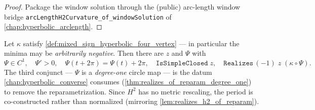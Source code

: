 \begin{proof}
  \leanok
  Package the window solution through the (public) arc-length window bridge
  \texttt{arcLengthH2Curvature\_of\_windowSolution} of
  \cref{chap:hyperbolic_arclength}.
\end{proof}

\begin{theorem}
  \label{thm:hyperbolic_mixed_converse_reparam_deg1}
  Let $\kappa$ satisfy \cref{def:mixed_sign_hyperbolic_four_vertex} — in
  particular the minima may be \emph{arbitrarily negative}.  Then there are
  $z$ and $\Psi$ with
  \[
    \Psi\in C^1,\quad \Psi'>0,\quad
    \Psi(t+2\pi)=\Psi(t)+2\pi,\quad
    \texttt{IsSimpleClosed}\;z,\quad
    \texttt{Realizes}\,(-1)\;z\;(\kappa\circ\Psi).
  \]
  The third conjunct — $\Psi$ is a \emph{degree-one} circle map — is the
  datum \cref{chap:hyperbolic_converse} consumes
  (\cref{thm:realizes_of_reparam_degree_one}) to remove the
  reparametrization.  Since $H^2$ has no metric rescaling, the period is
  co-constructed rather than normalized (mirroring
  \cref{lem:realizes_h2_of_reparam}).
\end{theorem}

